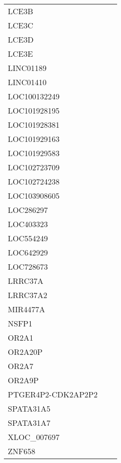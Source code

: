 \begin{tabular}{lcc}
LCE3B              &                &            \\
LCE3C              &                &            \\
LCE3D              &                &            \\
LCE3E              &                &            \\
LINC01189          &                &            \\
LINC01410          &                &            \\
LOC100132249       &                &            \\
LOC101928195       &                &            \\
LOC101928381       &                &            \\
LOC101929163       &                &            \\
LOC101929583       &                &            \\
LOC102723709       &                &            \\
LOC102724238       &                &            \\
LOC103908605       &                &            \\
LOC286297          &                &            \\
LOC403323          &                &            \\
LOC554249          &                &            \\
LOC642929          &                &            \\
LOC728673          &                &            \\
LRRC37A            &                &            \\
LRRC37A2           &                &            \\
MIR4477A           &                &            \\
NSFP1              &                &            \\
OR2A1              &                &            \\
OR2A20P            &                &            \\
OR2A7              &                &            \\
OR2A9P             &                &            \\
PTGER4P2-CDK2AP2P2 &                &            \\
SPATA31A5          &                &            \\
SPATA31A7          &                &            \\
XLOC\_007697        &                &            \\
ZNF658             &                &            \\
\bottomrule
\end{tabular}
